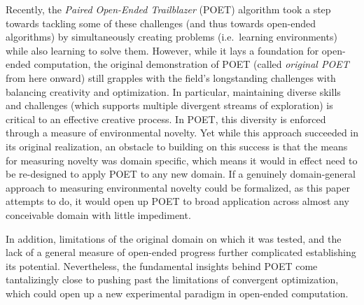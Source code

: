 \documentclass{article}
\newcommand{\ks}[1]{\comments{\textcolor{purple}{[Ken: #1]}}}
\newcommand{\comments}[1]{#1} %
\begin{document}
Recently, the \emph{Paired Open-Ended Trailblazer} (POET) algorithm \cite{wang2019paired, wang2019poetGECCO} took a step towards tackling some of these challenges (and thus towards open-ended algorithms) by simultaneously creating problems (i.e.\ learning environments) while also learning to solve them. However, while it lays a foundation for open-ended computation, the original demonstration of POET (called \emph{original POET} from here onward) still grapples with the field's longstanding challenges with balancing creativity and optimization. 
In particular, maintaining diverse skills and challenges (which supports multiple divergent streams of exploration) is critical to an effective creative process.  In POET, this diversity is enforced through a measure of environmental novelty.  Yet while this approach succeeded in its original realization, an obstacle to building on this success is that the means for measuring novelty was domain specific, which means it would in effect need to be re-designed to apply POET to any new domain.  If a genuinely domain-general approach to measuring environmental novelty could be formalized, as this paper attempts to do, it would open up POET to broad application across almost any conceivable domain with little impediment.

In addition, limitations of the original domain on which it was tested, and the lack of a general measure of open-ended progress further complicated establishing its potential. Nevertheless, the fundamental insights behind POET come tantalizingly close to pushing past the limitations of convergent optimization, which could open up a new experimental paradigm in open-ended computation.  
\end{document}
